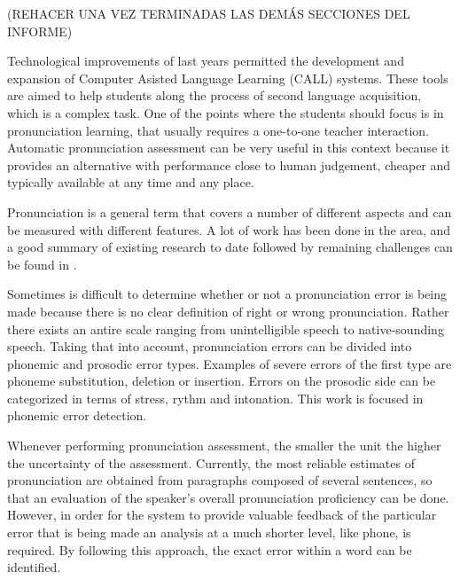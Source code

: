 (REHACER UNA VEZ TERMINADAS LAS DEM\'AS SECCIONES DEL INFORME)

Technological improvements of last years permitted the development and expansion of Computer 
Asisted Language Learning (CALL) systems. These tools are aimed to help students along the
process of second language acquisition, which is a complex task. One of the points where the
students should focus is in pronunciation learning, that usually requires a one-to-one teacher
interaction. Automatic pronunciation assessment can be very useful in this
context because it provides an alternative with performance close to human judgement, 
cheaper and typically available at any time and any place.

Pronunciation is a general term that covers a number of different aspects and can be measured
with different features. A lot of work has been done in the area, and a good summary of 
existing research to date followed by remaining challenges can be found in 
\cite{where_we_are_go}.

Sometimes is difficult to determine whether or not a 
pronunciation error is being made because there is no clear definition of right or wrong
pronunciation. Rather there exists an antire scale ranging from unintelligible speech to
native-sounding speech. Taking that into account, pronunciation errors can be divided into
phonemic and prosodic error types. Examples of severe errors of the first type are
phoneme substitution, deletion or insertion. Errors on the prosodic side can be
categorized in terms of stress, rythm and intonation. This work is focused in phonemic
error detection.

Whenever performing pronunciation assessment, the smaller the unit the higher the
uncertainty of the assessment. Currently, the most reliable estimates of pronunciation 
are obtained from paragraphs composed of several sentences, so that an evaluation of the 
speaker's overall pronunciation proficiency can be done. However, in order for the system
to provide valuable feedback of the particular error that is being made an analysis at a
much shorter level, like phone, is required. By following this approach, the exact error within
a word can be identified.

